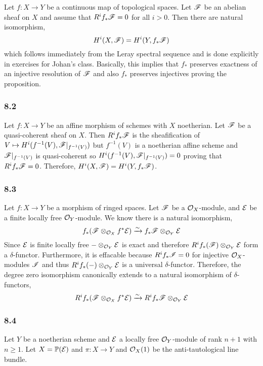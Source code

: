 \documentclass[12pt]{article}
\begin{document}
Let $f : X \to Y$ be a continuous map of topological spaces. Let $\mathscr{F}$ be an abelian sheaf on $X$ and assume that $R^i f_* \mathscr{F} = 0$ for all $i > 0$. Then there are natural isomorphism,
\[ H^i(X, \mathscr{F}) = H^i(Y, f_* \mathscr{F}) \]
which follows immediately from the Leray spectral sequence and is done explicitly in exercises for Johan's class. Basically, this implies that $f_*$ preserves exactness of an injective resolution of $\mathscr{F}$ and also $f_*$ preserves injectives proving the proposition.

\subsubsection{8.2}

Let $f : X \to Y$ be an affine morphism of schemes with $X$ noetherian. Let $\mathscr{F}$ be a quasi-coherent sheaf on $X$. Then $R^i f_* \mathscr{F}$ is the sheafification of $V \mapsto H^i(f^{-1}(V), \mathscr{F}|_{f^{-1}(V)})$ but $f^{-1}(V)$ is a noetherian affine scheme and $\mathscr{F} |_{f^{-1}(V)}$ is quasi-coherent so $H^i(f^{-1}(V), \mathscr{F}|_{f^{-1}(V)}) = 0$ proving that $R^i f_* \mathscr{F} = 0$. Therefore, $H^i(X, \mathscr{F}) = H^i(Y, f_* \mathscr{F})$.

\subsubsection{8.3}

Let $f : X \to Y$ be a morphism of ringed spaces. Let $\mathscr{F}$ be a $\mathcal{O}_{X}$-module, and $\mathcal{E}$ be a finite locally free $\mathcal{O}_{Y}$-module. We know there is a natural isomorphism,
\[ f_* (\mathscr{F} \otimes_{\mathcal{O}_{X}} f^* \mathcal{E}) \xrightarrow{\sim} f_* \mathscr{F} \otimes_{\mathcal{O}_{Y}} \mathcal{E} \]
Since $\mathcal{E}$ is finite locally free $- \otimes_{\mathcal{O}_{Y}} \mathcal{E}$ is exact and therefore $R^i f_* (\mathscr{F}) \otimes_{\mathcal{O}_{Y}} \mathcal{E}$ form a $\delta$-functor. Furthermore, it is effacable because $R^i f_* \mathscr{I} = 0$ for injective $\mathcal{O}_{X}$-modules $\mathscr{I}$ and thus $R^i f_* (-) \otimes_{\mathcal{O}_{Y}} \mathcal{E}$ is a universal $\delta$-functor. Therefore, the degree zero isomorphism canonically extends to a  natural isomorphism of $\delta$-functors,
\[ R^i f_* (\mathscr{F} \otimes_{\mathcal{O}_{X}} f^* \mathcal{E}) \xrightarrow{\sim} R^i f_* \mathscr{F} \otimes_{\mathcal{O}_{Y}} \mathcal{E} \]

\subsubsection{8.4}

Let $Y$ be a noetherian scheme and $\mathcal{E}$ a locally free $\mathcal{O}_{Y}$-module of rank $n + 1$ with $n \ge 1$. Let $X = \mathbb{P}(\mathcal{E})$ and $\pi : X \to Y$ and $\mathcal{O}_{X}(1)$ be the anti-tautological line bundle.
\end{document}
